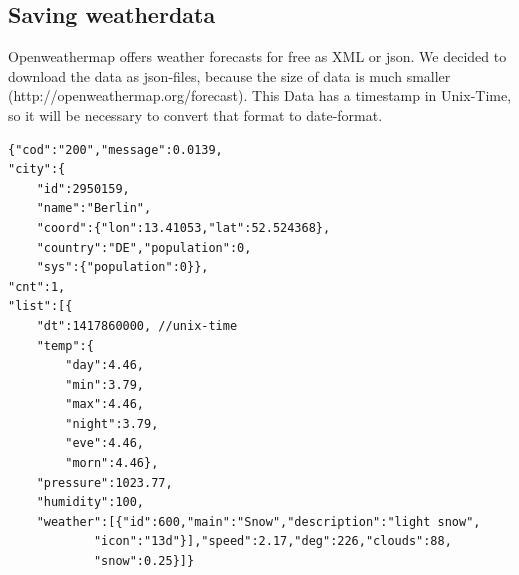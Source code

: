 \documentclass[paper=a4, fontsize=11pt]{article} %
\numberwithin{equation}{section} %
\numberwithin{figure}{section} %
\numberwithin{table}{section} %
\begin{document}
\newpage
\subsection{Saving weatherdata}
Openweathermap offers weather forecasts for free as XML or json. We decided to download the data as json-files, because the size of data is much smaller (http://openweathermap.org/forecast). This Data has a timestamp in Unix-Time, so it will be necessary to convert that format to date-format. 
\begin{lstlisting}
{"cod":"200","message":0.0139,
"city":{
	"id":2950159,
    "name":"Berlin",
	"coord":{"lon":13.41053,"lat":52.524368},
	"country":"DE","population":0,
	"sys":{"population":0}},
"cnt":1,
"list":[{
	"dt":1417860000, //unix-time
	"temp":{
		"day":4.46,
		"min":3.79,
		"max":4.46,
		"night":3.79,
		"eve":4.46,
		"morn":4.46},
	"pressure":1023.77,
	"humidity":100,
	"weather":[{"id":600,"main":"Snow","description":"light snow",
    		"icon":"13d"}],"speed":2.17,"deg":226,"clouds":88,
   	 		"snow":0.25}]}
\end{lstlisting}
\end{document}
